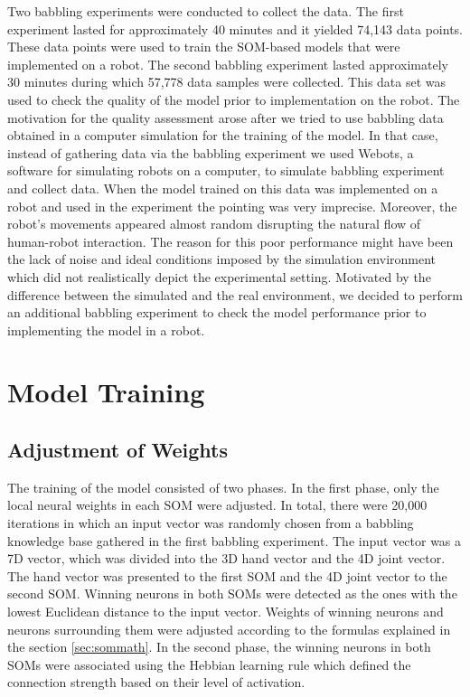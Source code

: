 Two babbling experiments were conducted to collect the data. The first experiment lasted for approximately 40 minutes and it yielded 74,143 data points. These data points were used to train the SOM-based models that were implemented on a robot. The second babbling experiment lasted approximately 30 minutes during which 57,778 data samples were collected. This data set was used to check the quality of the model prior to implementation on the robot. The motivation for the quality assessment arose after we tried to use babbling data obtained in a computer simulation for the training of the model. In that case, instead of gathering data via the babbling experiment we used Webots, a software for simulating robots on a computer, to simulate babbling experiment and collect data. When the model trained on this data was implemented on a robot and used in the experiment the pointing was very imprecise. Moreover, the robot's movements appeared almost random disrupting the natural flow of human-robot interaction. The 
reason for this poor performance might have been the lack of noise and ideal conditions imposed by the simulation environment which did not realistically depict the experimental setting. Motivated by the difference between the simulated and the real environment, we decided to perform an additional babbling experiment to check the model performance prior to implementing the model in a robot. 


\section{Model Training}
\label{sec:exp-modtrain}

\subsection{Adjustment of Weights}
The training of the model consisted of two phases. In the first phase, only the 
local neural weights in each SOM were adjusted. In total, there were 20,000 
iterations in which an input vector was randomly chosen from a babbling 
knowledge base gathered in the first babbling experiment. The input vector was 
a 7D vector, which was divided into the 3D hand vector and the 4D joint vector. 
The hand vector was presented to the first SOM and the 4D joint vector to the 
second SOM. Winning neurons in both SOMs were detected as the ones with the 
lowest Euclidean distance to the input vector. Weights of winning neurons and 
neurons surrounding them were adjusted according to the formulas explained in 
the section \ref{sec:sommath}.
In the second phase, the winning neurons in both SOMs were associated using the Hebbian learning rule which defined the connection strength based on their level of activation.

